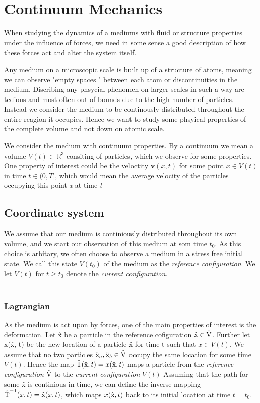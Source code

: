 \chapter{Continuum Mechanics}
When studying the dynamics of a mediums with fluid or structure properties under the influence of forces, we need in some sense a good description of how these forces act and alter the system itself.

Any medium on a microscopic scale is built up of a structure of atoms, meaning we can observe "empty spaces " between each atom or discontinuities in the medium. Discribing any phsycial phenomen on larger scales in such a way are tedious and most often out of bounds due to the high number of particles. Instead we consider the medium to be continously distributed throughout the entire reagion it occupies. Hence we want to study some phsyical properties of the complete volume and not down on atomic scale. 

We consider the medium with continuum properties. By a continuum we mean a volume $V(t) \subset \mathbb{R}^3$ 
consiting of particles, which we observe for some properties. One property of interest could be the veloctity $\textbf{v}(x,t)$ for some point $x \in V(t)$ in time $t \in (0, T]$, which would mean the average velocity of the particles occupying this point \textit{x} at time \textit{t}  

\section{Coordinate system}
We assume that our medium is continiously distributed throughout its own volume, and we start our observation of this medium
at som time $t_0$. As this choice is arbitary, we often choose to observe a medium in a stress free initial state. We call this state $V(t_0)$ of the medium as the \textit{reference configuration}. We let $V(t)$ for 
$t \geq t_0$ denote the \textit{current configuration}. \\ \\

\subsection{Lagrangian}
As the medium is act upon by forces, one of the main properties of interest is the deformation. Let \^{x} be a particle in the reference cofiguration $\text{\^{x}} \in \text{\^{V}}$. 
Further let x(\^x, t) be the new location of a particle \^x for time t such that $x \in V(t)$. We assume that no two particles $\text{\^{x}}_a, \text{\^{x}}_b \in \text{\^{V}}$ occupy the same location for some time $V(t)$.
Hence the map $\text{\^{T}}(\text{\^{x}}, t) = x(\text{\^{x}}, t)$ maps a particle  from the \textit{reference configuration} $\text{\^{V}}$ to the  \textit{current configuration} $V(t)$
Assuming that the path for some \^{x} is continious in time, we can define the inverse mapping $\text{\^{T}}^{-1}(x, t) = \text{\^{x}}(x, t)$, which maps $x(\text{\^{x}}, t)$ back to its initial location at time $t = t_0$. \\

